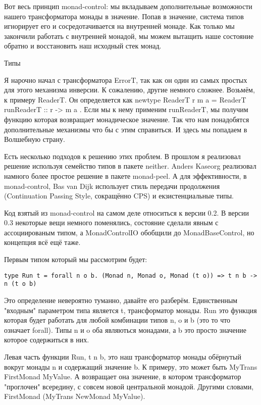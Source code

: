 Вот весь принцип monad-control: мы вкладываем дополнительные возможности нашего трансформатора монады в значение. Попав в значение, система типов игнорирует его и сосредотачивается на внутренней монаде. Как только мы закончили работать с внутренней монадой, мы можем вытащить наше состояние обратно и восстановить наш исходный стек монад.

Типы

Я нарочно начал с трансформатора ErrorT, так как он один из самых простых для этого механизма инверсии. К сожалению, другие немного сложнее. Возьмём, к примеру ReaderT. Он определяется как newtype ReaderT r m a = ReaderT { runReaderT :: r -> m a }. Если мы к нему применим runReaderT, мы получим функцию которая возвращает монадическое значение. Так что нам понадобятся дополнительные механизмы что бы с этим справиться. И здесь мы попадаем в Волшебную страну.

Есть несколько подходов к решению этих проблем. В прошлом я реализовал решение используя семейство типов в пакете neither. Anders Kaseorg реализовал намного более простое решение в пакете monad-peel. А для эффективности, в monad-control, Bas van Dijk использует стиль передачи продолжения (Continuation Passing Style, сокращённо CPS) и екзистенциальные типы.

Код взятый из monad-control на самом деле относиться к версии 0.2. В версии 0.3 некоторые вещи немного поменялись, состояние сделали явным с ассоциированым типом, а MonadControlIO обобщили до MonadBaseControl, но концепция всё ещё таже.

Первым типом который мы рассмотрим будет:

\begin{lstlisting}
type Run t = forall n o b. (Monad n, Monad o, Monad (t o)) => t n b -> n (t o b)
\end{lstlisting}

Это определение невероятно туманно, давайте его разберём. Единственным "входным" параметром типа является t, трансформатор монады. Run это функция которая будет работать для любой комбинации типов n, o и b (это то что означает forall). Типы n и o оба являються монадами, а b это просто значение которое содержиться в них.

Левая часть функции Run, t n b, это наш трансформатор монады обёрнутый вокруг монады n и содержащий значение b. К примеру, это может быть MyTrans FirstMonad MyValue. А возвращает она значение, в котором трансформатор "проглочен" всередину, с совсем новой центральной монадой. Другими словами, FirstMonad (MyTrans NewMonad MyValue). 


